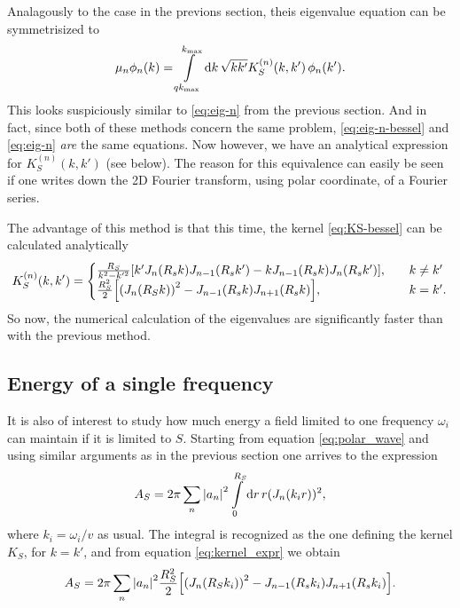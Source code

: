 \documentclass[11pt,a4paper, 
swedish,english %
]{article}
\begin{document}
Analagously to the case in the previons section, theis eigenvalue
equation can be symmetrisized to
\begin{equation}\label{eq:eig-n-bessel}
\mu_n\phi_n(k) = \int_{qk_{\max}}^{{k_{\max}}}\rd{k}\,
\sqrt{kk'} K_S^{(n)}(k, k')\,\phi_n(k').
\end{equation}
This looks suspiciously similar to \eqref{eq:eig-n} from the previous section. And in fact, since both of these methods concern the same problem, \eqref{eq:eig-n-bessel} and \eqref{eq:eig-n} \emph{are} the same equations. Now however, we have an analytical expression for $K_S^{(n)}(k, k')$ (see below). The reason for this equivalence can easily be seen if one writes down the 2D Fourier transform, using polar coordinate, of a Fourier series. 

The advantage of this method is that this time, the kernel
\eqref{eq:KS-bessel} can be calculated analytically
\cite[formula 5.54]{Gradshteyn-Ryzhik}
\begin{equation}\label{eq:kernel_expr}
K_S^{(n)}(k, k') =
\begin{cases}
\frac{R_S}{k^2-k'^2}
\qty[k'J_{n}(R_sk)J_{n-1}(R_sk')-kJ_{n-1}(R_sk)J_{n}(R_sk')]
\qc &k\neq k'\\
\frac{R_S^2}{2}\qty[ \qty(J_{n}(R_Sk))^2
-J_{n-1}(R_sk)J_{n+1}(R_sk)]
\qc &k= k'.
\end{cases}
\end{equation}
So now, the numerical calculation of the eigenvalues are significantly
faster than with the previous method.


\subsection{Energy of a single frequency}
It is also of interest to study how much energy a field limited to one frequency
$\omega_i$ can maintain if it is limited to $S$. Starting from equation \eqref{eq:polar_wave}
and using similar arguments as in the previous section one arrives to the expression
\begin{equation}
A_S=2\pi\sum_n \abs{a_n}^2\int_0^{R_S}\rd r \, r (J_n(k_ir))^2,
\end{equation}
where $k_i={\omega_i}/{v}$ as usual.
The integral is recognized as the one defining the kernel $K_S$, for $k=k'$, and from equation \eqref{eq:kernel_expr} we obtain
\begin{equation}\label{eq:energy_single}
A_S=2\pi \sum_n \abs{a_n}^2\frac{R_S^2}{2}\qty[ \qty(J_{n}(R_Sk_i))^2
-J_{n-1}(R_sk_i)J_{n+1}(R_sk_i)].
  \end{equation}
\end{document}
